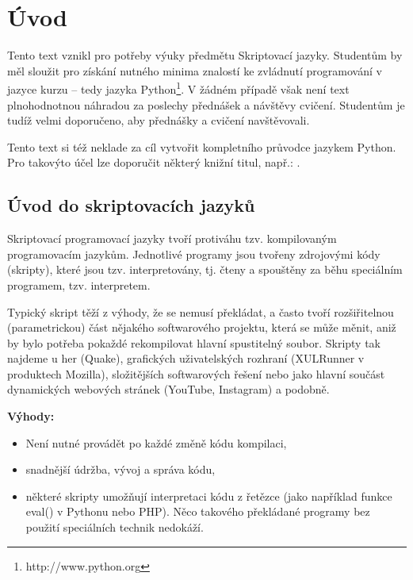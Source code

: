 \chapter{Úvod}%

Tento text vznikl pro potřeby výuky předmětu Skriptovací jazyky. Studentům by měl sloužit
pro získání nutného minima znalostí ke zvládnutí programování v jazyce kurzu
-- tedy jazyka Python\footnote{http://www.python.org}. V žádném případě
však není text plnohodnotnou náhradou za poslechy přednášek a návštěvy cvičení. Studentům je tudíž velmi doporučeno, aby
přednášky a cvičení navštěvovali.



Tento text si též neklade za cíl vytvořit kompletního průvodce jazykem Python. Pro takovýto účel lze doporučit některý knižní titul, např.: \cite{harms-mcdonald}.

\section{Úvod do skriptovacích jazyků}
Skriptovací programovací jazyky tvoří protiváhu tzv. kompilovaným programovacím jazykům. Jednotlivé programy jsou tvořeny zdrojovými kódy (skripty), které jsou tzv. interpretovány, tj. čteny a spouštěny za běhu spe\-ciál\-ním programem, tzv. interpretem.

Typický skript těží z výhody, že se nemusí překládat, a často tvoří rozšiřitelnou (parametrickou) část nějakého softwarového projektu, která se může měnit, aniž by bylo potřeba pokaždé rekompilovat hlavní spustitelný soubor. Skripty tak najdeme u her (Quake), grafických uživatelských rozhraní (XULRunner v produktech Mozilla), složitějších softwarových řešení nebo jako hlavní součást dynamických webových stránek (YouTube, Instagram) a podobně.

\newpage

\noindent
{\textbf{Výhody:}}
\begin{itemize}

\item Není nutné provádět po každé změně kódu kompilaci,
\item snadnější údržba, vývoj a správa kódu,
\item některé skripty umožňují interpretaci kódu z řetězce (jako například funkce eval() v Pythonu nebo PHP). Něco takového překládané programy bez použití speciálních technik nedokáží.
\end{itemize}

